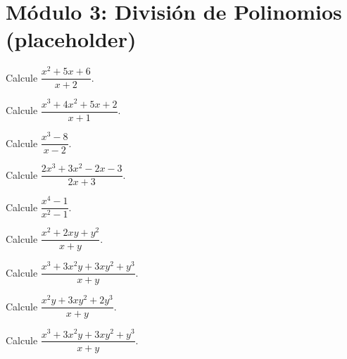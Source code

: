 
\section*{Módulo 3: División de Polinomios (placeholder)}



\begin{ejercicio}
Calcule $\dfrac{x^2+5x+6}{x+2}$.
\end{ejercicio}

\begin{ejercicio}
Calcule $\dfrac{x^3+4x^2+5x+2}{x+1}$.
\end{ejercicio}

\begin{ejercicio}
Calcule $\dfrac{x^3-8}{x-2}$.
\end{ejercicio}

\begin{ejercicio}
Calcule $\dfrac{2x^3+3x^2-2x-3}{2x+3}$.
\end{ejercicio}

\begin{ejercicio}
Calcule $\dfrac{x^4-1}{x^2-1}$.
\end{ejercicio}


\begin{ejercicio}
Calcule $\dfrac{x^2+2xy+y^2}{x+y}$.
\end{ejercicio}

\begin{ejercicio}
Calcule $\dfrac{x^3+3x^2y+3xy^2+y^3}{x+y}$.
\end{ejercicio}

\begin{ejercicio}
Calcule $\dfrac{x^2y+3xy^2+2y^3}{x+y}$.
\end{ejercicio}

\begin{ejercicio}
Calcule $\dfrac{x^3+3x^2y+3xy^2+y^3}{x+y}$.
\end{ejercicio}

